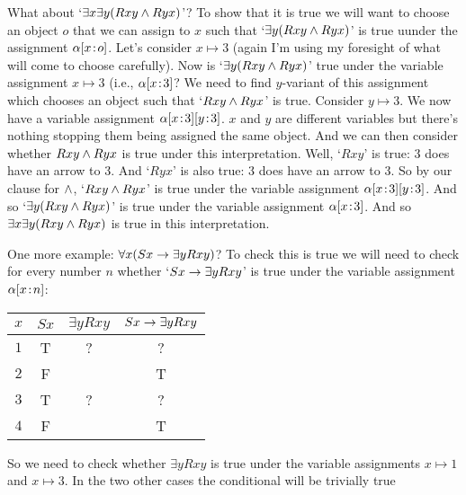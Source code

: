 What about `$\exists x \exists y(Rxy \mathbin{\wedge} Ryx)$'? To show that it is true we will want to choose an object $o$ that we can assign to $x$ such that `$\exists y (Rxy\mathbin{\wedge} Ryx)$' is true uunder the assignment $\alpha[x \!:\! o]$. Let's consider $x\mapsto 3$ (again I'm using my foresight of what will come to choose carefully). Now is `$\exists y (Rxy\mathbin{\wedge} Ryx)$'  true under the variable assignment $x\mapsto 3$ (i.e., $\alpha[x \!:\! 3]$? We need to find $y$-variant of this assignment which chooses an object such that `$Rxy\mathbin{\wedge} Ryx$' is true. Consider $y\mapsto 3$. We now have a variable assignment $\alpha[x \!:\! 3][y \!:\! 3]$. $x$ and $y$ are different variables but there's nothing stopping them being assigned the same object. And we can then consider whether $Rxy\mathbin{\wedge} Ryx$ is true under this interpretation. Well, `$Rxy$' is true: 3 does have an arrow to 3. And `$Ryx$' is also true: 3 does have an arrow to 3. So by our clause for $\mathbin{\wedge}$, `$Rxy\mathbin{\wedge} Ryx$' is true under the variable assignment $\alpha[x \!:\! 3][y \!:\! 3]$. And so `$\exists y(Rxy\mathbin{\wedge} Ryx)$' is true under the variable assignment $\alpha[x \!:\! 3]$. And so $\exists x\exists y(Rxy\mathbin{\wedge} Ryx)$ is true in this interpretation.

One more example: $\forall x(Sx\rightarrow \exists y Rxy)$? To check this is true we will need to check for every number $n$ whether `$Sx\rightarrow \exists y Rxy$' is true under the variable assignment $\alpha[x \!:\! n]$: 
\begin{center}
\begin{tabular}{c|ccc}
$x$&$Sx$&$\exists y Rxy$&$Sx\rightarrow\exists y Rxy$\Bstrut\\\hline\Tstrut
$1$&T&?&?\\
$2$&F&&T\\
$3$&T&?&?\\
$4$&F&&T
\end{tabular}
\end{center}

So we need to check  whether $\exists y Rxy$ is true under the variable assignments $x\mapsto 1$ and $x\mapsto 3$. In the two other cases the conditional will be trivially true


